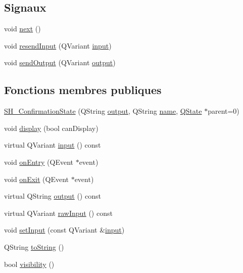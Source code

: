 \subsection*{Signaux}
\begin{DoxyCompactItemize}
\item 
void \hyperlink{classSH__GenericState_a030e67a872956135c52e6876d960a7b5}{next} ()
\item 
void \hyperlink{classSH__InOutState_afa791181eb61a18d4337a04827f9b200}{resend\-Input} (Q\-Variant \hyperlink{classSH__InOutState_a04364c76d2fd8a3781e7b325955e5bd9}{input})
\item 
void \hyperlink{classSH__InOutState_ad40e929a5537eb1d4883d5aa6eee5b15}{send\-Output} (Q\-Variant \hyperlink{classSH__InOutState_a1a2fd4f34484125058e20730aaee7e46}{output})
\end{DoxyCompactItemize}
\subsection*{Fonctions membres publiques}
\begin{DoxyCompactItemize}
\item 
\hyperlink{classSH__ConfirmationState_ae20a090cb19782e7def85e02f3275fe3}{S\-H\-\_\-\-Confirmation\-State} (Q\-String \hyperlink{classSH__InOutState_a1a2fd4f34484125058e20730aaee7e46}{output}, Q\-String \hyperlink{classSH__NamedObject_a970f265df31b28b2179bbbceb6170ac2}{name}, \hyperlink{classQState}{Q\-State} $\ast$parent=0)
\item 
void \hyperlink{classSH__InOutState_a918e8a7f5fe00dc16004e46eeee1281d}{display} (bool can\-Display)
\item 
virtual Q\-Variant \hyperlink{classSH__InOutState_a04364c76d2fd8a3781e7b325955e5bd9}{input} () const 
\item 
void \hyperlink{classSH__StatementState_ac62f9c27b2966034e56762a6e532dbe4}{on\-Entry} (Q\-Event $\ast$event)
\item 
void \hyperlink{classSH__InOutState_a36636cba0d68476288bce5fd4c041db0}{on\-Exit} (Q\-Event $\ast$event)
\item 
virtual Q\-String \hyperlink{classSH__InOutState_a1a2fd4f34484125058e20730aaee7e46}{output} () const 
\item 
virtual Q\-Variant \hyperlink{classSH__InOutState_a4b1ca094de91c47690ec2d1e95678273}{raw\-Input} () const 
\item 
void \hyperlink{classSH__StatementState_a20e5cf0df2d918a16f73a50a5c7d065e}{set\-Input} (const Q\-Variant \&\hyperlink{classSH__InOutState_a04364c76d2fd8a3781e7b325955e5bd9}{input})
\item 
Q\-String \hyperlink{classSH__GenericState_a5480c5ee725fd801d8f6292cd4c803b8}{to\-String} ()
\item 
bool \hyperlink{classSH__InOutState_a8c496b2fe21a51a587c6e4409c0f37ec}{visibility} ()
\end{DoxyCompactItemize}


